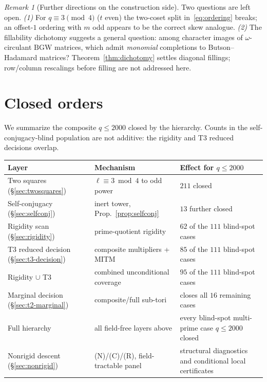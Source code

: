 \documentclass[11pt]{article}
\theoremstyle{plain}
\theoremstyle{definition}
\theoremstyle{remark}
\newtheorem{remark}[theorem]{Remark}
\begin{document}
\begin{remark}[Further directions on the construction side]\label{rem:maryfurther}
Two questions are left open. \emph{(1)} For $q\equiv3\pmod4$ ($t$ even) the
two-coset split in~\eqref{eq:ordering} breaks; an offset-$1$ ordering with $m$
odd appears to be the correct skew analogue. \emph{(2)} The fillability
dichotomy suggests a general question: among character images of
$\omega$-circulant $\mathrm{BGW}$ matrices, which admit \emph{monomial}
completions to Butson--Hadamard matrices? Theorem~\ref{thm:dichotomy} settles
diagonal fillings; row/column rescalings before filling are not addressed here.
\end{remark}

\section{Closed orders}\label{sec:results}

We summarize the composite $q\le2000$ closed by the hierarchy. Counts in the
self-conjugacy-blind population are not additive: the rigidity and T3 reduced
decisions overlap.

\begin{center}
\small
\begin{tabular}{p{} p{} p{}}
\hline
Layer & Mechanism & Effect for $q\le2000$\\
\hline
Two squares (\S\ref{sec:twosquares}) & $\ell\equiv3\bmod4$ to odd power &
$211$ closed\\
Self-conjugacy (\S\ref{sec:selfconj}) & inert tower, Prop.~\ref{prop:selfconj} &
$13$ further closed\\
Rigidity scan (\S\ref{sec:rigidity}) & prime-quotient rigidity &
$62$ of the $111$ blind-spot cases\\
T3 reduced decision (\S\ref{sec:t3-decision}) & composite multipliers + MITM &
$85$ of the $111$ blind-spot cases\\
Rigidity $\cup$ T3 & combined unconditional coverage &
$95$ of the $111$ blind-spot cases\\
Marginal decision (\S\ref{sec:t2-marginal}) & composite/full sub-tori &
closes all $16$ remaining cases\\
Full hierarchy & all field-free layers above &
every blind-spot multi-prime case $q\le2000$ closed\\
Nonrigid descent (\S\ref{sec:nonrigid}) & (N)/(C)/(R), field-tractable panel &
structural diagnostics and conditional local certificates\\
\hline
\end{tabular}
\end{center}
\end{document}
